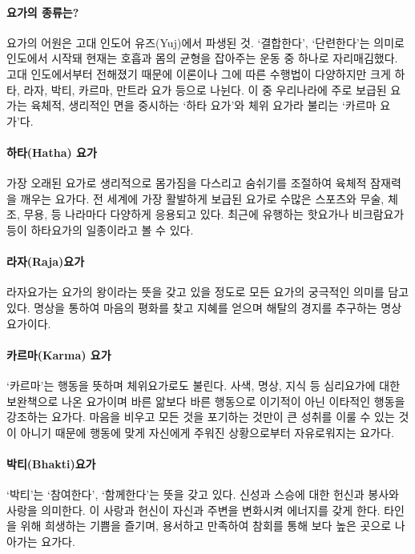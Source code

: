 \documentclass[12pt, a4paper, oneside]{book}
\begin{document}
\paragraph{요가의 종류는? }
요가의 어원은 고대 인도어 유즈(Yuj)에서 파생된 것. ‘결합한다’, ‘단련한다’는 의미로 인도에서 시작돼 현재는 호흡과 몸의 균형을 잡아주는 운동 중 하나로 자리매김했다. 고대 인도에서부터 전해졌기 때문에 이론이나 그에 따른 수행법이 다양하지만 크게 하타, 라자, 박티, 카르마, 만트라 요가 등으로 나뉜다. 이 중 우리나라에 주로 보급된 요가는 육체적, 생리적인 면을 중시하는 ‘하타 요가’와 체위 요가라 불리는 ‘카르마 요가’다. 

\paragraph{하타(Hatha) 요가 }
가장 오래된 요가로 생리적으로 몸가짐을 다스리고 숨쉬기를 조절하여 육체적 잠재력을 깨우는 요가다. 전 세계에 가장 활발하게 보급된 요가로 수많은 스포츠와 무술, 체조, 무용, 등 나라마다 다양하게 응용되고 있다. 최근에 유행하는 핫요가나 비크람요가 등이 하타요가의 일종이라고 볼 수 있다. 

\paragraph{라자(Raja)요가 }
라자요가는 요가의 왕이라는 뜻을 갖고 있을 정도로 모든 요가의 궁극적인 의미를 담고 있다. 명상을 통하여 마음의 평화를 찾고 지혜를 얻으며 해탈의 경지를 추구하는 명상 요가이다. 

\paragraph{카르마(Karma) 요가 }
‘카르마’는 행동을 뜻하며 체위요가로도 불린다. 사색, 명상, 지식 등 심리요가에 대한 보완책으로 나온 요가이며 바른 앎보다 바른 행동으로 이기적이 아닌 이타적인 행동을 강조하는 요가다. 마음을 비우고 모든 것을 포기하는 것만이 큰 성취를 이룰 수 있는 것이 아니기 때문에 행동에 맞게 자신에게 주워진 상황으로부터 자유로워지는 요가다. 

\paragraph{박티(Bhakti)요가 }
‘박티’는 ‘참여한다’, ‘함께한다’는 뜻을 갖고 있다. 신성과 스승에 대한 헌신과 봉사와 사랑을 의미한다. 이 사랑과 헌신이 자신과 주변을 변화시켜 에너지를 갖게 한다. 타인을 위해 희생하는 기쁨을 즐기며, 용서하고 만족하여 참회를 통해 보다 높은 곳으로 나아가는 요가다. 
\end{document}
